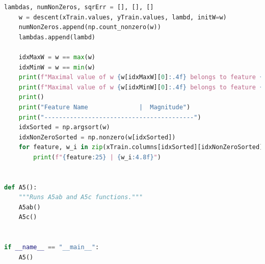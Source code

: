 \documentclass{article}
\newcommand{\1}{\mathbf{1}}
\begin{document}
\begin{enumerate}
\begin{lstlisting}[language=Python]
    lambdas, numNonZeros, sqrErr = [], [], []
    w = descent(xTrain.values, yTrain.values, lambd, initW=w)
    numNonZeros.append(np.count_nonzero(w))
    lambdas.append(lambd)

    idxMaxW = w == max(w)
    idxMinW = w == min(w)
    print(f"Maximal value of w {w[idxMaxW][0]:.4f} belongs to feature {xTrain.columns[idxMaxW][0]}")
    print(f"Maximal value of w {w[idxMinW][0]:.4f} belongs to feature {xTrain.columns[idxMinW][0]}")
    print()
    print("Feature Name              |  Magnitude")
    print("-----------------------------------------")
    idxSorted = np.argsort(w)
    idxNonZeroSorted = np.nonzero(w[idxSorted])
    for feature, w_i in zip(xTrain.columns[idxSorted][idxNonZeroSorted], w[idxSorted][idxNonZeroSorted]):
        print(f"{feature:25} | {w_i:4.8f}")


def A5():
    """Runs A5ab and A5c functions."""
    A5ab()
    A5c()


if __name__ == "__main__":
    A5()
\end{lstlisting}
\end{enumerate}



\newpage
\end{document}
